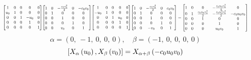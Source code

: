 \documentclass[11pt]{article}
\theoremstyle{definition}
\begin{document}
\[
\scaletoalign{\textwidth}{{\left[\begin{matrix}1 & 0 & 0 & 0 & 0\\u_{0} & 1 & 0 & 0 & 0\\0 & 0 & 1 & - u_{0} & 0\\0 & 0 & 0 & 1 & 0\\0 & 0 & 0 & 0 & 1\end{matrix}\right]} {\left[\begin{matrix}1 & 0 & - \frac{c_{0} v_{0}^{2}}{2} & 0 & - c_{0} v_{0}\\0 & 1 & 0 & 0 & 0\\0 & 0 & 1 & 0 & 0\\0 & 0 & 0 & 1 & 0\\0 & 0 & v_{0} & 0 & 1\end{matrix}\right]} {\left[\begin{matrix}1 & 0 & 0 & 0 & 0\\- u_{0} & 1 & 0 & 0 & 0\\0 & 0 & 1 & u_{0} & 0\\0 & 0 & 0 & 1 & 0\\0 & 0 & 0 & 0 & 1\end{matrix}\right]} {\left[\begin{matrix}1 & 0 & - \frac{c_{0} v_{0}^{2}}{2} & 0 & c_{0} v_{0}\\0 & 1 & 0 & 0 & 0\\0 & 0 & 1 & 0 & 0\\0 & 0 & 0 & 1 & 0\\0 & 0 & - v_{0} & 0 & 1\end{matrix}\right]} = {\left[\begin{matrix}1 & 0 & 0 & - \frac{c_{0} u_{0} v_{0}^{2}}{2} & 0\\0 & 1 & \frac{c_{0} u_{0} v_{0}^{2}}{2} & - \frac{c_{0} u_{0}^{2} v_{0}^{2}}{2} & - c_{0} u_{0} v_{0}\\0 & 0 & 1 & 0 & 0\\0 & 0 & 0 & 1 & 0\\0 & 0 & 0 & u_{0} v_{0} & 1\end{matrix}\right]}}
\]
\[
\alpha = \left( 0, \  -1, \  0, \  0, \  0\right), \quad \beta = \left( -1, \  0, \  0, \  0, \  0\right)
\]
\[
\scaletoalign{\textwidth}{\left[ X_{\alpha}\left(u_{0}\right), X_{\beta}\left(v_{0}\right) \right] = X_{\alpha + \beta}\left(- c_{0} u_{0} v_{0}\right)}
\]
\end{document}
